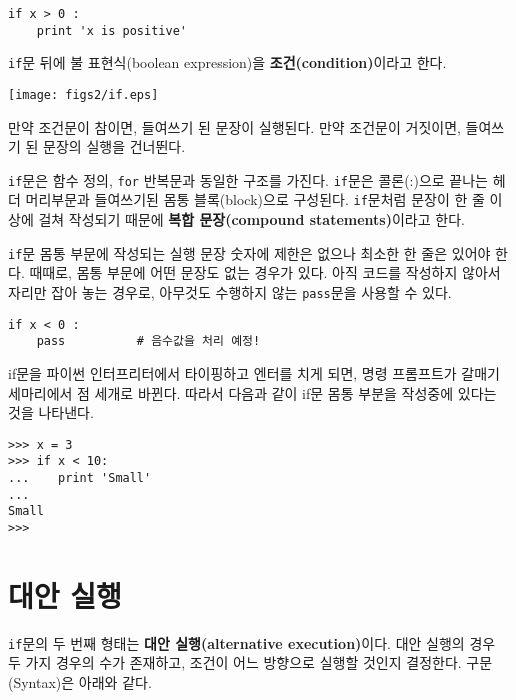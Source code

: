 \beforeverb
\begin{verbatim}
if x > 0 :
    print 'x is positive'
\end{verbatim}
\afterverb
%
{\tt if}문 뒤에 불 표현식(boolean expression)을 {\bf 조건(condition)}이라고 한다.

\beforefig
\centerline{\texttt{[image: figs2/if.eps]}}
\afterfig

만약 조건문이 참이면, 들여쓰기 된 문장이 실행된다. 
만약 조건문이 거짓이면, 들여쓰기 된 문장의 실행을 건너뛴다.


{\tt if}문은 함수 정의, {\tt for} 반복문과 동일한 구조를 가진다.
{\tt if}문은 콜론(:)으로 끝나는 헤더 머리부문과 들여쓰기된 몸통 블록(block)으로 구성된다.
{\tt if}문처럼 문장이 한 줄 이상에 걸쳐 작성되기 때문에 {\bf 복합 문장(compound statements)}이라고 한다.

{\tt if}문 몸통 부문에 작성되는 실행 문장 숫자에 제한은 없으나 최소한 한 줄은 있어야 한다.
때때로, 몸통 부문에 어떤 문장도 없는 경우가 있다. 
아직 코드를 작성하지 않아서 자리만 잡아 놓는 경우로, 아무것도 수행하지 않는 {\tt pass}문을 사용할 수 있다.


\beforeverb
\begin{verbatim}
if x < 0 :
    pass          # 음수값을 처리 예정!
\end{verbatim}
\afterverb
%
if문을 파이썬 인터프리터에서 타이핑하고 엔터를 치게 되면, 
명령 프롬프트가 갈매기 세마리에서 점 세개로 바뀐다. 
따라서 다음과 같이 if문 몸통 부분을 작성중에 있다는 것을 나타낸다.

\beforeverb
\begin{verbatim}
>>> x = 3
>>> if x < 10:
...    print 'Small'
... 
Small
>>>
\end{verbatim}
\afterverb
%

\section{대안 실행}


{\tt if}문의 두 번째 형태는 {\bf 대안 실행(alternative execution)}이다.
대안 실행의 경우 두 가지 경우의 수가 존재하고, 조건이 어느 방향으로 실행할 것인지 결정한다. 
구문(Syntax)은 아래와 같다.

